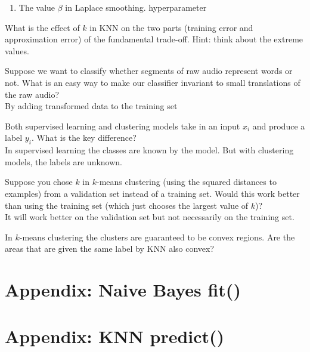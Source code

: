 \documentclass{article}
\def\ans#1{{\color{ans}#1}}
\begin{document}
{\begin{enumerate}
\item The value $\beta$ in Laplace smoothing. \ans{hyperparameter}
\end{enumerate}
\item What is the effect of $k$ in KNN on the two parts (training error and approximation error) of the fundamental trade-off. Hint: think about the extreme values. \\
\ans{
}
\item Suppose we want to classify whether segments of raw audio represent words or not. What is an easy way to make our classifier invariant to small translations of the raw audio? \\
\ans{
   By adding transformed data to the training set
}
\item Both supervised learning and clustering models take in an input $x_i$ and produce a label $y_i$. What is the key difference? \\
\ans{
   In supervised learning the classes are known by the model. But with clustering models, the labels are unknown.
}
\item Suppose you chose $k$ in $k$-means clustering (using the squared distances to examples) from a validation set instead of a training set. Would this work better than using the training set (which just chooses the largest value of $k$)? \\
\ans{
   It will work better on the validation set but not necessarily on the training set.
}
\item In $k$-means clustering the clusters are guaranteed to be convex regions. Are the areas that are given the same label by KNN also convex? \\
\ans{
}
}


\appendix

\section{Appendix: Naive Bayes fit()}
\label{appendix:NaiveBayes}
\begin{center}
    
\end{center}

\section{Appendix: KNN predict()}
\label{appendix:KNN}
\begin{center}
    
\end{center}
\end{document}
